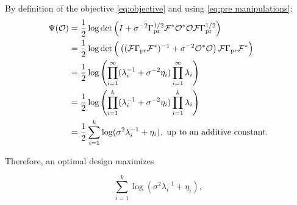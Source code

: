 \documentclass{amsart}
\numberwithin{equation}{section}
\begin{document}
By definition of the objective \eqref{eq:objective} and using
\eqref{eq:pre manipulations}:
\begin{align}\label{eq:mod objective}
  \begin{split}
    \Psi ( \mathcal{O} ) &=\frac12 \log \det \left( I + \sigma^{-2}
    \Gamma_{\textup{pr}}^{1/2} \mathcal{F} ^* \mathcal{O}^* \mathcal{O} \mathcal{F} \Gamma_{\textup{pr}}^{1/2} \right )\\
    &=\frac12 \log \det \Big ( \left ( (\mathcal{F} \Gamma_{\textup{pr}} \mathcal{F}^* )^{-1} +
    \sigma^{-2}\mathcal{O}^* \mathcal{O} \right ) \mathcal{F} \Gamma_{\textup{pr}} \mathcal{F}^* \Big )\\
    &=\frac12 \log \left (\prod_{i=1}^{\infty} ( \lambda_i^{-1} + \sigma^{-2} \eta_i ) \prod_{i=1}^{\infty} \lambda_i \right ) \\
    &=\frac12 \log \left ( \prod_{i=1}^{k} ( \lambda_i^{-1} + \sigma^{-2} \eta_i )\prod_{i=1}^{k} \lambda_i \right )\\
    &=\frac12 \sum_{i=1}^{k} \log (\sigma^2\lambda_i^{-1} + \eta_i), \text{ up to an additive constant}. 
  \end{split}
\end{align}

Therefore, an optimal design maximizes

\begin{equation}\label{eq:true target}
  \sum_{i=1}^{k}\log (\sigma^2 \lambda_i^{-1} + \eta_i),
\end{equation}




\optimalvsnot
\end{document}

